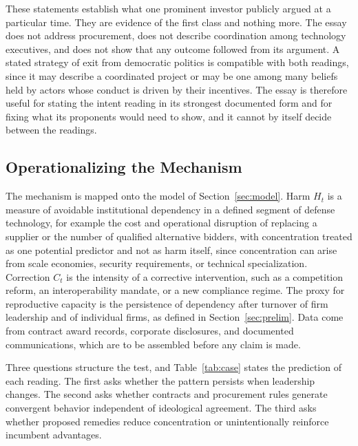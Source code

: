 \documentclass[12pt]{article}
\theoremstyle{remark}
\begin{document}
These statements establish what one prominent investor publicly argued at a particular time. They are evidence of the first class and nothing more. The essay does not address procurement, does not describe coordination among technology executives, and does not show that any outcome followed from its argument. A stated strategy of exit from democratic politics is compatible with both readings, since it may describe a coordinated project or may be one among many beliefs held by actors whose conduct is driven by their incentives. The essay is therefore useful for stating the intent reading in its strongest documented form and for fixing what its proponents would need to show, and it cannot by itself decide between the readings.

\subsection{Operationalizing the Mechanism}

The mechanism is mapped onto the model of Section~\ref{sec:model}. Harm $H_t$ is a measure of avoidable institutional dependency in a defined segment of defense technology, for example the cost and operational disruption of replacing a supplier or the number of qualified alternative bidders, with concentration treated as one potential predictor and not as harm itself, since concentration can arise from scale economies, security requirements, or technical specialization. Correction $C_t$ is the intensity of a corrective intervention, such as a competition reform, an interoperability mandate, or a new compliance regime. The proxy for reproductive capacity is the persistence of dependency after turnover of firm leadership and of individual firms, as defined in Section~\ref{sec:prelim}. Data come from contract award records, corporate disclosures, and documented communications, which are to be assembled before any claim is made.

Three questions structure the test, and Table~\ref{tab:case} states the prediction of each reading. The first asks whether the pattern persists when leadership changes. The second asks whether contracts and procurement rules generate convergent behavior independent of ideological agreement. The third asks whether proposed remedies reduce concentration or unintentionally reinforce incumbent advantages.
\end{document}
